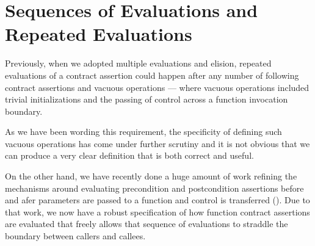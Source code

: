 \section{Sequences of Evaluations and Repeated Evaluations}

Previously, when we adopted multiple evaluations and elision,
repeated evaluations of a contract assertion could happen
after any number of following contract assertions
and vacuous operations --- where vacuous operations included
trivial initializations and the passing of control
across a function invocation boundary.

As we have been wording this requirement, the specificity
of defining such vacuous operations has come under further
scrutiny and it is not obvious that we can produce a very
clear definition that is both correct and useful.

On the other hand, we have recently done a huge amount of
work refining the mechanisms around evaluating precondition
and postcondition assertions before and afer parameters
are passed to a function and control is transferred (\cite{P3487R0}).
Due to that work, we now have a robust specification of how
function contract assertions are evaluated that freely
allows that sequence of evaluations to straddle the boundary
between callers and callees.


